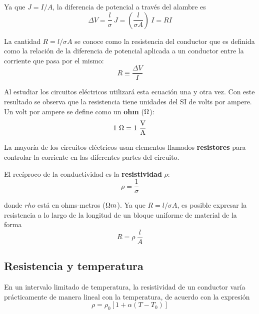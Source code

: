     \PN Ya que $J = I/A$, la diferencia de potencial a través del alambre es
    \begin{equation*}
      \Delta V = \frac{l}{\sigma} \ J = \left(\frac{l}{\sigma A}\right) \ I = RI
    \end{equation*}

    \PN La cantidad $R = l/\sigma A$ se conoce como la resistencia del conductor que es definida como la relación de la
    diferencia de potencial aplicada a un conductor entre la corriente que pasa por el mismo:
    \begin{equation*}
      R \equiv \frac{\Delta V}{I}
    \end{equation*}

    \PN Al estudiar los circuitos eléctricos utilizará esta ecuación una y otra vez. Con este resultado se observa que
    la resistencia tiene unidades del SI de volts por ampere. Un volt por ampere se define como un \textbf{ohm}
    ($\ohm$):
    \begin{equation*}
      1 \ \ohm = 1 \ \frac{\text{V}}{\text{A}}
    \end{equation*}

    \PN La mayoría de los circuitos eléctricos usan elementos llamados \textbf{resistores} para controlar la corriente
    en las diferentes partes del circuito.

    \PN El recíproco de la conductividad es la \textbf{resistividad} $\rho$:
    \begin{equation*}
      \rho = \frac{1}{\sigma}
    \end{equation*}

    \PN donde $rho$ está en ohms-metros ($\ohm m$). Ya que $R = l/\sigma A$, es posible expresar la resistencia a lo
    largo de la longitud de un bloque uniforme de material de la forma
    \begin{equation*}
      R = \rho \ \frac{l}{A}
    \end{equation*}

  \subsection{Resistencia y temperatura}
    \PN En un intervalo limitado de temperatura, la resistividad de un conductor varía prácticamente de manera lineal
    con la temperatura, de acuerdo con la expresión
    \begin{equation*}
      \rho = \rho_{0} \left[1 + \alpha (T - T_{0})\right]
    \end{equation*}

